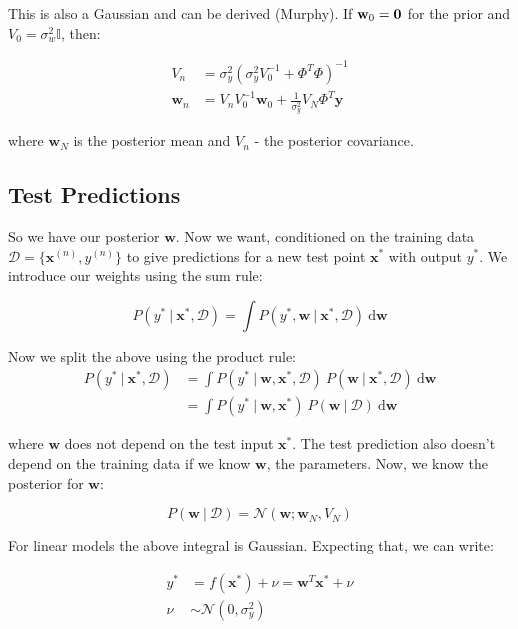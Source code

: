 \documentclass{article}
\newcommand{\vf}[1]{\mathbf{#1}}
\newcommand{\bx}{\vf{x}}
\newcommand{\by}{\vf{y}}
\newcommand{\bw}{\vf{w}}
\newcommand{\giv}{\ |\ }
\newcommand{\de}{\text{d}}
\begin{document}
This is also a Gaussian and can be derived (Murphy). If $\bw_0 = \bf{0}$ for the prior and $V_0 = \sigma_w^2 \mathbb{I}$, then:

\begin{align*}
    V_n &= \sigma_y^2(\sigma_y^2 V_0^{-1} + \Phi^T \Phi)^{-1} \\
    \bw_n &= V_n V_0^{-1} \bw_0 + \frac{1}{\sigma_y^2} V_N \Phi^T \by
\end{align*}

where $\bw_N$ is the posterior mean and $V_n$ - the posterior covariance.

\subsection{Test Predictions}
So we have our posterior $\bw$. Now we want, conditioned on the training data $\mathcal{D} = \{\bx^{(n)}, y^{(n)}\}$ to give predictions for a new test point $\bx^*$ with output $y^*$. We introduce our weights using the sum rule:

\begin{equation*}
    P(y^* \giv \bx^*, \mathcal{D}) = \int P(y^*, \bw \giv \bx^*, \mathcal{D}) \ \de\bw
\end{equation*}

Now we split the above using the product rule:
\begin{align*}
    P(y^* \giv \bx^*, \mathcal{D}) &= \int P(y^* \giv \bw, \bx^*, \mathcal{D})
        \ P(\bw \giv \bx^*, \mathcal{D}) \ \de\bw \\
    &= \int P(y^* \giv \bw, \bx^*)\ 
        P(\bw \giv \mathcal{D}) \ \de\bw
\end{align*}

where $\bw$ does not depend on the test input $\bx^*$. The test prediction also doesn't depend on the training data if we know $\bw$, the parameters. Now, we know the posterior for $\bw$:

\begin{equation*}
    P(\bw \giv \mathcal{D}) = \mathcal{N}(\bw; \bw_N, V_N)
\end{equation*}

For linear models the above integral is Gaussian. Expecting that, we can write:

\begin{align*}
    y^* &= f(\bx^*) + \nu = \bw^T \bx^* + \nu \\
    \nu &\sim \mathcal{N}(0, \sigma_y^2)
\end{align*}
\end{document}
